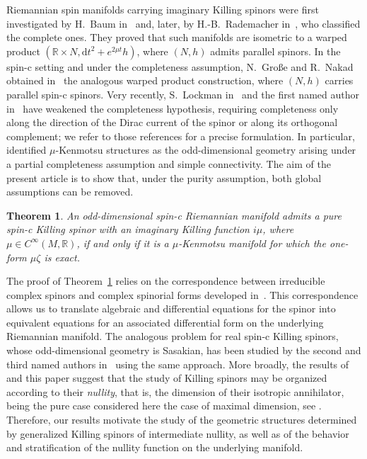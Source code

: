 \documentclass[10pt,a4paper,twoside,reqno]{amsart}
\theoremstyle{plain}
\newtheorem{thm}{Theorem}[section]
\theoremstyle{definition}
\theoremstyle{remark}
\def\R{\mathbb{R}}
\def\dd{\mathrm{d}}
\def\R{\mathbb{R}}
\def\dd{\mathrm{d}}
\begin{document}
\noindent
Riemannian spin manifolds carrying imaginary Killing spinors were first investigated by H.~Baum in~\cite{B1989*,B1989} and, later, by H.-B.~Rademacher in~\cite{R1991}, who classified the complete ones. They proved that such manifolds are isometric to a warped product $(\R\times N, \dd t^2 + e^{2 \mu t}h)$, where $(N,h)$ admits parallel spinors. In the spin-c setting and under the completeness assumption, N.~Gro\ss e and R.~Nakad obtained in~\cite{GN2015} the analogous warped product construction, where $(N,h)$ carries parallel spin-c spinors. Very recently, S.~Lockman in~\cite{Lockman_2025} and the first named author in~\cite{C2026} have weakened the completeness hypothesis, requiring completeness only along the direction of the Dirac current of the spinor or along its orthogonal complement; we refer to those references for a precise formulation. In particular,~\cite[Thm.~4.16]{C2026} identified $\mu$-Kenmotsu structures as the odd-dimensional geometry arising under a partial completeness assumption and simple connectivity. The aim of the present article is to show that, under the purity assumption, both global assumptions can be removed.

\begin{thm}
\label{thm:maintheorem}
An odd-dimensional spin-c Riemannian manifold admits a pure spin-c Killing spinor with an imaginary Killing function $i\mu$, where $\mu \in C^\infty(M, \mathbb{R})$, if and only if it is a $\mu$-Kenmotsu manifold for which the one-form $\mu\zeta$ is exact.
\end{thm}

\noindent
The proof of Theorem~\ref{thm:maintheorem} relies on the correspondence between irreducible complex spinors and complex spinorial forms developed in~\cite{Algebraic_Complex_Square_2025,Complex_Differential_Spinors_2026}. This correspondence allows us to translate algebraic and differential equations for the spinor into equivalent equations for an associated differential form on the underlying Riemannian manifold. The analogous problem for real spin-c Killing spinors, whose odd-dimensional geometry is Sasakian, has been studied by the second and third named authors in~\cite{Sasakian_spin-c_2026} using the same approach. More broadly, the results of \cite{Sasakian_spin-c_2026} and this paper suggest that the study of Killing spinors may be organized according to their \emph{nullity}, that is, the dimension of their isotropic annihilator, being the pure case considered here the case of maximal dimension, see \cite{Trautman1994}. Therefore, our results motivate the study of the geometric structures determined by generalized Killing spinors of intermediate nullity, as well as of the behavior and stratification of the nullity function on the underlying manifold.\medskip
\end{document}
